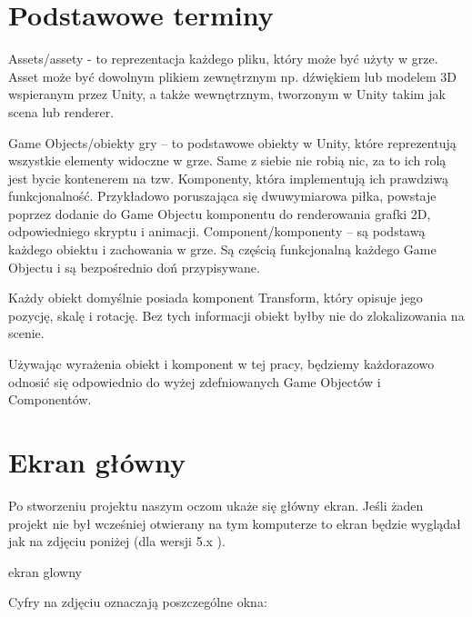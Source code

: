 \documentclass[brudnopis]{xmgr}
\begin{document}
\section{Podstawowe terminy}

Assets/assety - to reprezentacja każdego pliku, który może być użyty w grze. Asset może być dowolnym plikiem zewnętrznym np. dźwiękiem lub modelem 3D wspieranym przez Unity, a także wewnętrznym, tworzonym w Unity takim jak scena lub renderer. 

Game Objects/obiekty gry – to podstawowe obiekty w Unity, które reprezentują wszystkie elementy widoczne w grze. Same z siebie nie robią nic, za to ich rolą jest bycie kontenerem na tzw. Komponenty, która implementują ich prawdziwą funkcjonalność. Przykładowo poruszająca się dwuwymiarowa piłka, powstaje poprzez dodanie do Game Objectu komponentu do renderowania grafki 2D, odpowiedniego skryptu i animacji. Component/komponenty – są podstawą każdego obiektu i zachowania w grze. Są częścią funkcjonalną każdego Game Objectu i są bezpośrednio doń przypisywane. 

Każdy obiekt domyślnie posiada komponent Transform, który opisuje jego pozycję, skalę i rotację. Bez tych informacji obiekt byłby nie do zlokalizowania na scenie. 

Używając wyrażenia obiekt i komponent w tej pracy, będziemy każdorazowo odnosić się odpowiednio do wyżej zdefniowanych Game Objectów i Componentów. 

\section{Ekran główny}

Po stworzeniu projektu naszym oczom ukaże się główny ekran. Jeśli żaden projekt nie był wcześniej otwierany na tym komputerze to ekran będzie wyglądał jak na zdjęciu poniżej (dla wersji 5.x ). 

ekran glowny

Cyfry na zdjęciu oznaczają poszczególne okna: 
\end{document}
